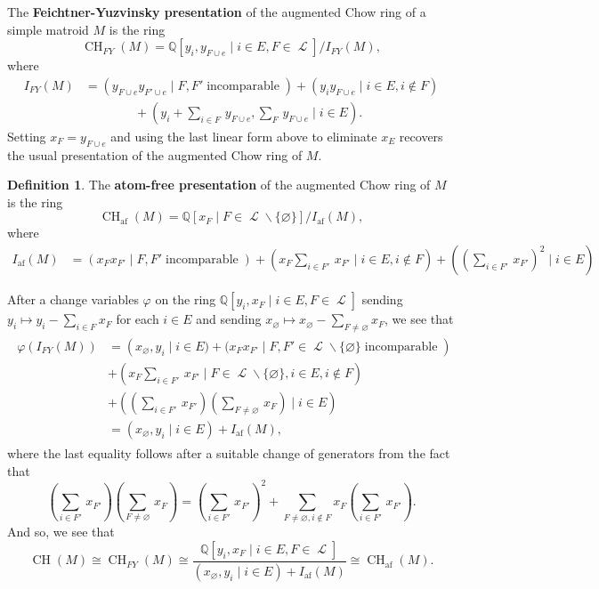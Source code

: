 \documentclass[11pt, reqno]{amsart}
\DeclareMathOperator{\aChow}{CH}             		%
\DeclareMathOperator{\atomfree}{af}
\newcommand{\af}{{\atomfree}}
\renewcommand{\emptyset}{\varnothing}
\newcommand{\iso}{\cong}
\DeclareMathOperator{\LL}{\mathcal{L}}
\renewcommand{\phi}{\varphi}
\newcommand{\QQ}{\mathbb{Q}}
\renewcommand{\setminus}{\smallsetminus}
\newcommand{\term}[1]{\textbf{\textsf{#1}}}
\theoremstyle{definition}
\newtheorem{defn}[thm]{Definition}
\numberwithin{equation}{section}
\numberwithin{table}{section}
\begin{document}
\begin{spacing}{1.1}
The \term{Feichtner-Yuzvinsky presentation} of the augmented Chow ring of a simple matroid $M$ is the ring
\[ \aChow_{FY}(M) = \QQ\left[y_i, y_{F \cup e} \mid i \in E, F \in \LL \right]/I_{FY}(M), \]
where
\begin{align*}
I_{FY}(M) &= \left(y_{F \cup e}y_{F' \cup e} \mid F, F' \; \text{incomparable}\;\right) + (y_iy_{F \cup e} \mid i \in E, i \notin F) \\
&\qquad \qquad + (\textstyle y_i + \sum_{i \in F}\, y_{F \cup e}, \sum_F \, y_{F \cup e} \mid i \in E). 
\end{align*}
Setting $x_F = y_{F \cup e}$ and using the last linear form above to eliminate $x_E$ recovers the usual presentation of the augmented Chow ring of $M$.

\begin{defn}
The \term{atom-free presentation} of the augmented Chow ring of $M$ is the ring
\[ \aChow_\af(M) = \QQ[x_F \mid F \in \LL \setminus \{\emptyset\} ]/I_\af(M), \]
where
\begin{align*} 
I_\af(M) 
&= (x_Fx_{F'} \mid F, F' \; \text{incomparable}\;)  + (\textstyle x_F \sum_{i \in F'}\, x_{F'} \mid i \in E, i \notin F ) + ((\textstyle \sum_{i \in F'} \, x_{F'})^2 \mid i \in E)
\end{align*}
\end{defn}

After a change variables $\phi$ on the ring $\QQ[y_i, x_F \mid i \in E, F \in \LL]$ sending $y_i \mapsto y_i - \sum_{i \in F} x_F$ for each $i \in E$ and sending $x_\emptyset \mapsto x_\emptyset - \sum_{F \neq \emptyset} x_F$, we see that 
\begin{align} 
\begin{split} \label{augmented:change:of:variables}
\phi(I_{FY}(M)) &= \left(x_\emptyset, y_i \mid i \in E) + (x_Fx_{F'} \mid F, F' \in \LL \setminus \{\emptyset\} \; \text{incomparable}\;\right)  \\ 
&+ (\textstyle x_F\sum_{i \in F'} \, x_{F'} \mid F \in \LL \setminus \{\emptyset\}, i \in E, i \notin F ) \\
&+ (\textstyle (\sum_{i \in F'} \, x_{F'})(\sum_{F \neq \emptyset} \,x_F) \mid i \in E) 
\\
&= (x_\emptyset, y_i \mid i \in E) + I_\af(M),
\end{split}
\end{align}
where the last equality follows after a suitable change of generators from the fact that 
\[
\textstyle (\sum_{i \in F'} \, x_{F'})(\sum_{F \neq \emptyset} \,x_F) = (\sum_{i \in F'} \, x_{F'})^2 + \sum_{F \neq \emptyset, i \notin F} x_F(\sum_{i \in F'} \, x_{F'}). 
\] 
And so, we see that 
\[ 
\aChow(M) \iso \aChow_{FY}(M) \iso \frac{\QQ[y_i, x_F \mid i \in E, F \in \LL]}{(x_\emptyset, y_i \mid i \in E) + I_\af(M)} \iso \aChow_\af(M).
\]


\end{spacing}
\end{document}

